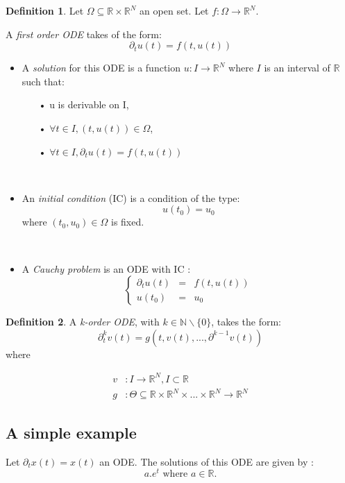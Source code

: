 \documentclass[10pt,a4paper]{article}
\theoremstyle{definition}
\newtheorem{definition}{Definition}
\theoremstyle{definition}
\theoremstyle{definition}
\begin{document}
\begin{definition}
Let $\Omega \subseteq \mathbb{R} \times \mathbb{R}^N$ an open set. Let $f: \Omega \rightarrow \mathbb{R}^N$. 

A \textit{first order ODE} takes of the form:
$$
\partial_t u(t) = f(t,u(t))
$$

\begin{itemize}
\item A \textit{solution} for this ODE is a function $u : I \rightarrow \mathbb{R}^N$ where $I$ is an interval of $\mathbb{R}$ such that:
	\begin{itemize}
	\item[•] u is derivable on I,
	\item[•] $\forall t \in I, (t, u(t)) \in \Omega$,
	\item[•] $\forall t \in I, \partial_t u(t) = f(t, u(t))$
	\end{itemize}
~

\item An \textit{initial condition} (IC) is a condition of the type:
$$
u(t_0) = u_0
$$
where $(t_0, u_0) \in \Omega$ is fixed.

~

\item A \textit{Cauchy problem} is an ODE with IC :
$$
\left \{
\begin{array}{rcl}
\partial_t u(t) & = & f(t, u(t)) \\
u(t_0) & = & u_0
\end{array}
\right.
$$
\end{itemize}
\end{definition}

\begin{definition}
A \textit{k-order ODE}, with $k \in \mathbb{N}\backslash \{0\}$, takes the form:
$$
\partial^k_t v(t) = g(t, v(t), ... , \partial^{k-1}v(t))
$$
where 

\begin{align*}
v &:  I \rightarrow \mathbb{R}^N, I\subset \mathbb{R} \\ 
g &:  \Theta \subseteq \mathbb{R} \times \mathbb{R}^N \times ... \times \mathbb{R}^N \rightarrow \mathbb{R}^N
\end{align*} 
\end{definition}

\subsection{A simple example}
Let $\partial_t x(t) = x(t)$ an ODE. The solutions of this ODE are given by : 
$$
a . e^t \text{ where } a\in \mathbb{R}.
$$
\end{document}
